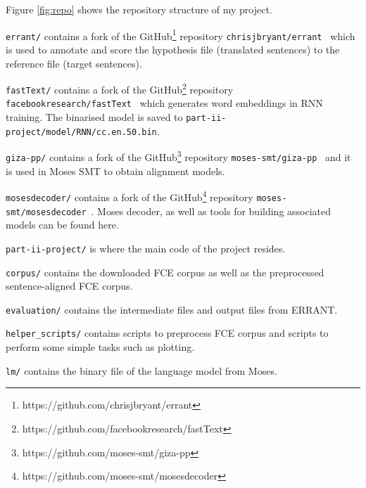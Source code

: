 \documentclass[12pt,a4paper,twoside]{report}
\begin{document}
Figure \ref{fig:repo} shows the repository structure of my project.

\texttt{errant/} contains a fork of the GitHub\footnote{https://github.com/chrisjbryant/errant} repository \texttt{chrisjbryant/errant}~\cite{bryant-etal-2017-automatic, felice-etal-2016-automatic} which is used to annotate and score the hypothesis file (translated sentences) to the reference file (target sentences).

\texttt{fastText/} contains a fork of the GitHub\footnote{https://github.com/facebookresearch/fastText} repository \texttt{facebookresearch/fastText}~\cite{grave2018learning} which generates word embeddings in RNN training. The binarised model is saved to \texttt{part-ii-project/model/RNN/cc.en.50.bin}.

\texttt{giza-pp/} contains a fork of the GitHub\footnote{https://github.com/moses-smt/giza-pp} repository \texttt{moses-smt/giza-pp}~\cite{giza_pp} and it is used in Moses SMT to obtain alignment models.

\texttt{mosesdecoder/} contains a fork of the GitHub\footnote{https://github.com/moses-smt/mosesdecoder} repository \texttt{moses-smt/mosesdecoder}~\cite{moses}. Moses decoder, as well as tools for building associated models can be found here.

\texttt{part-ii-project/} is where the main code of the project resides.

\hfill\begin{minipage}{\dimexpr\textwidth-0.8cm}
    \texttt{corpus/} contains the downloaded FCE corpus as well as the preprocessed sentence-aligned FCE corpus.
\end{minipage}

\hfill\begin{minipage}{\dimexpr\textwidth-0.8cm}
    \texttt{evaluation/} contains the intermediate files and output files from ERRANT.
\end{minipage}

\hfill\begin{minipage}{\dimexpr\textwidth-0.8cm}
    \texttt{helper\_scripts/} contains scripts to preprocess FCE corpus and scripts to perform some simple tasks such as plotting.
\end{minipage}

\hfill\begin{minipage}{\dimexpr\textwidth-0.8cm}
    \texttt{lm/} contains the binary file of the language model from Moses.
\end{minipage}
\end{document}
